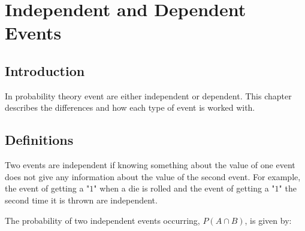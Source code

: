 \chapter{Independent and Dependent Events}
\label{m:p11}



\section{Introduction}
In probability theory event are either independent or dependent. This chapter describes the differences and how each type of event is worked with.


\section{Definitions}
Two events are independent if knowing something about the value of one event does not give any information about the value of the second event. For example, the event of getting a "$1$" when a die is rolled and the event of getting a "$1$" the second time it is thrown are independent.


The probability of two independent events occurring, $P(A \cap B)$, is given by:


